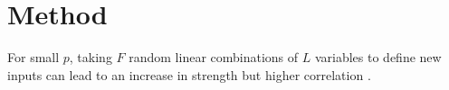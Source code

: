 \section{Method}

For small $p$, taking $F$ random linear combinations of $L$ variables to define new inputs can lead to an increase in strength but higher correlation \citep{breiman:2001}.
